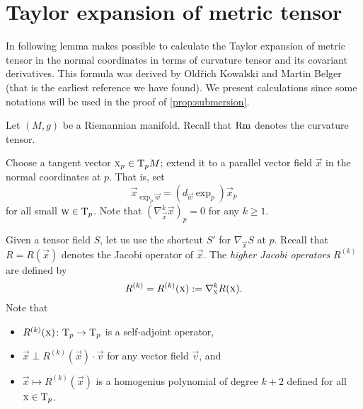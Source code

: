 \documentclass[a4paper,10pt]{article}
\begin{document}
\section{Taylor expansion of metric tensor}\label{sec:jet}

In following lemma makes possible to calculate the Taylor expansion of metric tensor in the normal coordinates in terms of curvature tensor and its covariant derivatives.
This formula was derived by Old\v{r}ich Kowalski and Martin Belger \cite[Proposition 2.2]{kowalski-belger} (that is the earliest reference we have found).
We present calculations since some notations will be used in the proof of \ref{prop:submersion}.

Let $(M,g)$ be a Riemannian manifold.
Recall that $\operatorname{\rm Rm}$ denotes the curvature tensor.

Choose a tangent vector $\text{\sc{x}}_p\in \mathrm{T}_pM$; 
extend it to a parallel vector field $\vec{x}$ in the normal coordinates at $p$.
That is, set 
\[\vec{x}_{\exp_p\vec{w}}=(d_\vec{w}\exp_p)\vec{x}_p\] for all small $\text{\sc{w}}\in \mathrm{T}_p$.
Note that $(\nabla^k_\vec{x} \vec{x})_p=0$ for any $k\ge 1$.

Given a tensor field $S$, let us use the shortcut $S'$ for $\nabla_\vec{x}S$ at $p$.
Recall that $R=R(\vec{x})$ denotes the Jacobi operator of $\vec{x}$.
The \emph{higher Jacobi operators} $R^{(k)}$ are defined by
\[R^{(k)}=R^{(k)}(\text{\sc{x}})\mathrel{{:}{=}}\nabla^k_{\text{\sc{x}}}R(\text{\sc{x}}).\]
Note that 
\begin{itemize}
\item $R^{(k)}(\text{\sc{x}})\colon\mathrm{T}_p\to\mathrm{T}_p$ is a self-adjoint operator, 
\item $\vec{x}\perp R^{(k)}(\vec{x})\cdot \vec{v}$ for any vector field $\vec{v}$, and
\item $\vec{x}\mapsto R^{(k)}(\vec{x})$ is a homogenius polynomial of degree $k+2$ defined for all $\text{\sc{x}}\in \mathrm{T}_p$.
\end{itemize}
\end{document}
